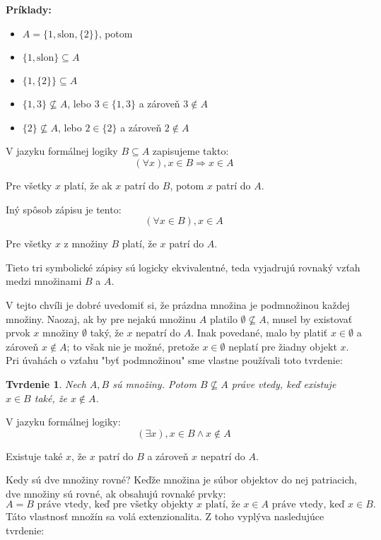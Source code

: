 \documentclass[12pt, a4paper]{article}
\theoremstyle{definition}
\theoremstyle{plain}
\newtheorem{theorem}[definition]{Tvrdenie}
\theoremstyle{remark}
\begin{document}
\noindent\textbf{Príklady:}
\begin{itemize}
    \item $A=\{1, \text{slon}, \{2\}\}$, potom
    \item $\{1, \text{slon}\} \subseteq A$
    \item $\{1, \{2\}\} \subseteq A$
    \item $\{1,3\} \not\subseteq A$, lebo $3 \in \{1,3\}$ a zároveň $3 \notin A$
    \item $\{2\} \not\subseteq A$, lebo $2 \in \{2\}$ a zároveň $2 \notin A$
\end{itemize}

\noindent V jazyku formálnej logiky $B \subseteq A$ zapisujeme takto:
$$ (\forall x), x \in B \Rightarrow x \in A $$
\begin{center}
Pre všetky $x$ platí, že ak $x$ patrí do $B$, potom $x$ patrí do $A$.
\end{center}
\noindent Iný spôsob zápisu je tento:
$$ (\forall x \in B), x \in A $$
\begin{center}
Pre všetky $x$ z množiny $B$ platí, že $x$ patrí do $A$. 
\end{center}
Tieto tri symbolické zápisy sú logicky ekvivalentné, teda vyjadrujú rovnaký vzťah medzi množinami $B$ a $A$.

V tejto chvíli je dobré uvedomiť si, že prázdna množina je podmnožinou každej množiny.
Naozaj, ak by pre nejakú množinu $A$ platilo $\emptyset \not\subseteq A$, musel by existovať prvok $x$ množiny $\emptyset$ taký, že $x$ nepatrí do $A$. Inak povedané, malo by platiť $x \in \emptyset$ a zároveň $x \notin A$;
to však nie je možné, pretože $x \in \emptyset$ neplatí pre žiadny objekt $x$.
Pri úvahách o vzťahu "byť podmnožinou" sme vlastne používali toto tvrdenie:

\begin{theorem}
Nech $A, B$ sú množiny.
Potom $B \not\subseteq A$ práve vtedy, keď existuje $x \in B$ také, že $x \notin A$.
\end{theorem}

\noindent V jazyku formálnej logiky:
$$ (\exists x), x \in B \land x \notin A $$
\begin{center}
Existuje také $x$, že $x$ patrí do $B$ a zároveň $x$ nepatrí do $A$.
\end{center}
Kedy sú dve množiny rovné?
Keďže množina je súbor objektov do nej patriacich, dve množiny sú rovné, ak obsahujú rovnaké prvky:
$$A = B \text{ práve vtedy, keď pre všetky objekty } x \text{ platí, že } x \in A \text{ práve vtedy, keď } x \in B.$$
Táto vlastnosť množín sa volá extenzionalita.
Z toho vyplýva nasledujúce tvrdenie:
\end{document}
